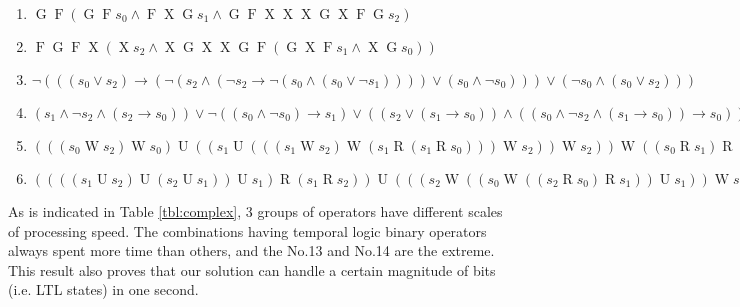 \begin{footnotesize}
\begin{enumerate}[leftmargin=0.5cm]
\item $\mathop{G}\mathop{F}(\mathop{G}\mathop{F}s_0 \mathrel{\wedge} \mathop{F}\mathop{X}\mathop{G}s_1 \mathrel{\wedge} \mathop{G}\mathop{F}\mathop{X}\mathop{X}\mathop{X}\mathop{G}\mathop{X}\mathop{F}\mathop{G}s_2)$
\item $\mathop{F}\mathop{G}\mathop{F}\mathop{X}(\mathop{X}s_2 \mathrel{\wedge} \mathop{X}\mathop{G}\mathop{X}\mathop{X}\mathop{G}\mathop{F}(\mathop{G}\mathop{X}\mathop{F}s_1 \mathrel{\wedge} \mathop{X}\mathop{G}s_0))$
\item $\mathop{\neg}(((s_0 \mathrel{\vee} s_2) \mathrel{\rightarrow} (\mathop{\neg}(s_2 \mathrel{\wedge} (\mathop{\neg}s_2 \mathrel{\rightarrow} \mathop{\neg}(s_0 \mathrel{\wedge} (s_0 \mathrel{\vee} \mathop{\neg}s_1)))) \mathrel{\vee} (s_0 \mathrel{\wedge} \mathop{\neg}s_0))) \mathrel{\vee} (\mathop{\neg}s_0 \mathrel{\wedge} (s_0 \mathrel{\vee} s_2)))$
\item $(s_1 \mathrel{\wedge} \mathop{\neg}s_2 \mathrel{\wedge} (s_2 \mathrel{\rightarrow} s_0)) \mathrel{\vee} \mathop{\neg}((s_0 \mathrel{\wedge} \mathop{\neg}s_0) \mathrel{\rightarrow} s_1) \mathrel{\vee} ((s_2 \mathrel{\vee} (s_1 \mathrel{\rightarrow} s_0)) \mathrel{\wedge} ((s_0 \mathrel{\wedge} \mathop{\neg}s_2 \mathrel{\wedge} (s_1 \mathrel{\rightarrow} s_0)) \mathrel{\rightarrow} s_0))$
\item $(((s_0 \mathrel{W} s_2) \mathrel{W} s_0) \mathrel{U} ((s_1 \mathrel{U} (((s_1 \mathrel{W} s_2) \mathrel{W} (s_1 \mathrel{R} (s_1 \mathrel{R} s_0))) \mathrel{W} s_2)) \mathrel{W} s_2)) \mathrel{W} ((s_0 \mathrel{R} s_1) \mathrel{R} (((s_2 \mathrel{U} s_1) \mathrel{U} s_1) \mathrel{R} ((s_0 \mathrel{W} s_2) \mathrel{W} s_1)))$
\item $((((s_1 \mathrel{U} s_2) \mathrel{U} (s_2 \mathrel{U} s_1)) \mathrel{U} s_1) \mathrel{R} (s_1 \mathrel{R} s_2)) \mathrel{U} (((s_2 \mathrel{W} ((s_0 \mathrel{W} ((s_2 \mathrel{R} s_0) \mathrel{R} s_1)) \mathrel{U} s_1)) \mathrel{W} s_0) \mathrel{W} (((s_0 \mathrel{R} s_1) \mathrel{R} (s_0 \mathrel{W} s_1)) \mathrel{U} s_0))$
\end{enumerate}
\end{footnotesize}

As is indicated in Table \ref{tbl:complex}, 3 groups of operators have different scales of processing speed. The combinations having temporal logic binary operators always spent more time than others, and the No.13 and No.14 are the extreme. This result also proves that our solution can handle a certain magnitude of bits (i.e. LTL states) in one second. 

